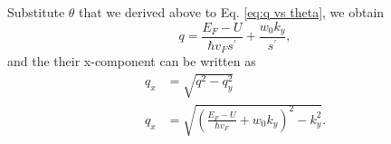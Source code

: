     Substitute $\theta$ that we derived above to Eq. \ref{eq:q vs theta}, we obtain
    \begin{equation} \label{eq:q}
        q = \frac{E_F-U}{\hbar v_F s^{\prime}}+\frac{w_0 k_y}{s^{\prime}},
    \end{equation}
    and the their x-component can be written as
    \begin{equation} \label{eq:qx}
        \begin{aligned}
        q_x &= \sqrt{q^2-q_y^2}\\
        q_x &= \sqrt{\left(\frac{E_F-U}{\hbar v_F}+w_0 k_y\right)^2-k_y^2}.\\
        \end{aligned}
    \end{equation}

